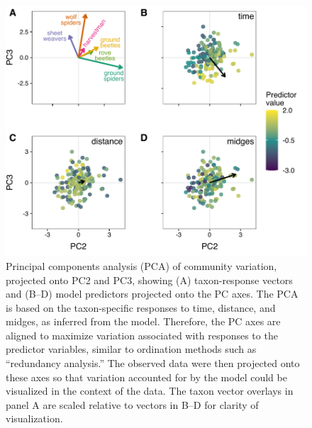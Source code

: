 \documentclass[12pt]{article}
\begin{document}
\begin{figure}
\centering
\includegraphics{figS1.pdf}
\caption{\label{fig:pca-23}
Principal components analysis (PCA) of community variation, projected onto
PC2 and PC3, showing (A) taxon-response vectors and
(B--D) model predictors projected onto the PC axes.
The PCA is based on the taxon-specific responses to time, distance, and midges,
as inferred from the model.
Therefore, the PC axes are aligned to maximize variation associated with responses
to the predictor variables, similar to ordination methods such as ``redundancy analysis.''
The observed data were then projected onto these axes so that variation accounted for
by the model could be visualized in the context of the data.
The taxon vector overlays in panel A are scaled relative to vectors in
B--D for clarity of visualization.
}
\end{figure}


\end{document}
